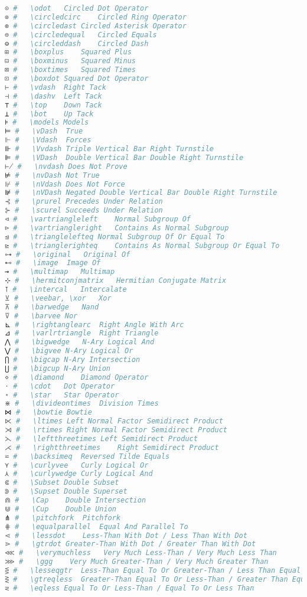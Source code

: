 \begin{lstlisting}[language=Julia, linewidth=\textwidth]
⊙ #   \odot   Circled Dot Operator
⊚ #   \circledcirc    Circled Ring Operator
⊛ #   \circledast Circled Asterisk Operator
⊜ #   \circledequal   Circled Equals
⊝ #   \circleddash    Circled Dash
⊞ #   \boxplus    Squared Plus
⊟ #   \boxminus   Squared Minus
⊠ #   \boxtimes   Squared Times
⊡ #   \boxdot Squared Dot Operator
⊢ #   \vdash  Right Tack
⊣ #   \dashv  Left Tack
⊤ #   \top    Down Tack
⊥ #   \bot    Up Tack
⊧ #   \models Models
⊨ #   \vDash  True
⊩ #   \Vdash  Forces
⊪ #   \Vvdash Triple Vertical Bar Right Turnstile
⊫ #   \VDash  Double Vertical Bar Double Right Turnstile
⊬ #   \nvdash Does Not Prove
⊭ #   \nvDash Not True
⊮ #   \nVdash Does Not Force
⊯ #   \nVDash Negated Double Vertical Bar Double Right Turnstile
⊰ #   \prurel Precedes Under Relation
⊱ #   \scurel Succeeds Under Relation
⊲ #   \vartriangleleft    Normal Subgroup Of
⊳ #   \vartriangleright   Contains As Normal Subgroup
⊴ #   \trianglelefteq Normal Subgroup Of Or Equal To
⊵ #   \trianglerighteq    Contains As Normal Subgroup Or Equal To
⊶ #   \original   Original Of
⊷ #   \image  Image Of
⊸ #   \multimap   Multimap
⊹ #   \hermitconjmatrix   Hermitian Conjugate Matrix
⊺ #   \intercal   Intercalate
⊻ #   \veebar, \xor   Xor
⊼ #   \barwedge   Nand
⊽ #   \barvee Nor
⊾ #   \rightanglearc  Right Angle With Arc
⊿ #   \varlrtriangle  Right Triangle
⋀ #   \bigwedge   N-Ary Logical And
⋁ #   \bigvee N-Ary Logical Or
⋂ #   \bigcap N-Ary Intersection
⋃ #   \bigcup N-Ary Union
⋄ #   \diamond    Diamond Operator
⋅ #   \cdot   Dot Operator
⋆ #   \star   Star Operator
⋇ #   \divideontimes  Division Times
⋈ #   \bowtie Bowtie
⋉ #   \ltimes Left Normal Factor Semidirect Product
⋊ #   \rtimes Right Normal Factor Semidirect Product
⋋ #   \leftthreetimes Left Semidirect Product
⋌ #   \rightthreetimes    Right Semidirect Product
⋍ #   \backsimeq  Reversed Tilde Equals
⋎ #   \curlyvee   Curly Logical Or
⋏ #   \curlywedge Curly Logical And
⋐ #   \Subset Double Subset
⋑ #   \Supset Double Superset
⋒ #   \Cap    Double Intersection
⋓ #   \Cup    Double Union
⋔ #   \pitchfork  Pitchfork
⋕ #   \equalparallel  Equal And Parallel To
⋖ #   \lessdot    Less-Than With Dot / Less Than With Dot
⋗ #   \gtrdot Greater-Than With Dot / Greater Than With Dot
⋘ #   \verymuchless   Very Much Less-Than / Very Much Less Than
⋙ #   \ggg    Very Much Greater-Than / Very Much Greater Than
⋚ #   \lesseqgtr  Less-Than Equal To Or Greater-Than / Less Than Equal To Or Greater Than
⋛ #   \gtreqless  Greater-Than Equal To Or Less-Than / Greater Than Equal To Or Less Than
⋜ #   \eqless Equal To Or Less-Than / Equal To Or Less Than

\end{lstlisting}
